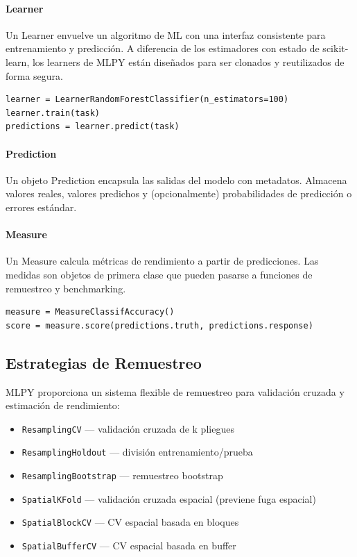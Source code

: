 \documentclass[twoside,11pt]{article}
\begin{document}
\paragraph{Learner}
Un Learner envuelve un algoritmo de ML con una interfaz consistente para entrenamiento y predicción. A diferencia de los estimadores con estado de scikit-learn, los learners de MLPY están diseñados para ser clonados y reutilizados de forma segura.

\begin{lstlisting}
learner = LearnerRandomForestClassifier(n_estimators=100)
learner.train(task)
predictions = learner.predict(task)
\end{lstlisting}

\paragraph{Prediction}
Un objeto Prediction encapsula las salidas del modelo con metadatos. Almacena valores reales, valores predichos y (opcionalmente) probabilidades de predicción o errores estándar.

\paragraph{Measure}
Un Measure calcula métricas de rendimiento a partir de predicciones. Las medidas son objetos de primera clase que pueden pasarse a funciones de remuestreo y benchmarking.

\begin{lstlisting}
measure = MeasureClassifAccuracy()
score = measure.score(predictions.truth, predictions.response)
\end{lstlisting}

\subsection{Estrategias de Remuestreo}

MLPY proporciona un sistema flexible de remuestreo para validación cruzada y estimación de rendimiento:

\begin{itemize}
  \item \texttt{ResamplingCV} --- validación cruzada de k pliegues
  \item \texttt{ResamplingHoldout} --- división entrenamiento/prueba
  \item \texttt{ResamplingBootstrap} --- remuestreo bootstrap
  \item \texttt{SpatialKFold} --- validación cruzada espacial (previene fuga espacial)
  \item \texttt{SpatialBlockCV} --- CV espacial basada en bloques
  \item \texttt{SpatialBufferCV} --- CV espacial basada en buffer
\end{itemize}
\end{document}
